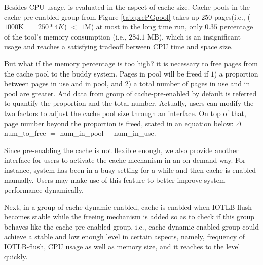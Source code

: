 Besides CPU usage, \name is evaluated in the aspect of cache size. Cache pools in the cache-pre-enabled group from Figure \ref{tab:prePGpool} takes up $250$ pages(i.e., ($1000$K $=$ $250 * 4K$) $<$ $1$M) at most in the long time run, only $0.35$ percentage of the tool's memory consumption (i.e., $284.1$ MB), which is an insignificant usage and reaches a satisfying tradeoff between CPU time and space size.

But what if the memory percentage is too high? it is necessary to free pages from the cache pool to the buddy system. Pages in pool will be freed if $1$) a proportion between pages in use and in pool, and $2$) a total number of pages in use and in pool are greater. And data from group of cache-pre-enabled by default is referred to quantify the proportion and the total number. Actually, users can modify the two factors to adjust the cache pool size through an interface. On top of that, page number beyond the proportion is freed, stated in an equation below: $\Delta$num\_to\_free $=$ num\_in\_pool $-$ num\_in\_use.

Since pre-enabling the cache is not flexible enough, we also provide another interface for users to activate the cache mechanism in an on-demand way. For instance, system has been in a busy setting for a while and then cache is enabled manually. Users may make use of this feature to better improve system performance dynamically.

Next, in a group of cache-dynamic-enabled, cache is enabled when IOTLB-flush becomes stable while the freeing mechanism is added so as to check if this group behaves like the cache-pre-enabled group, i.e., cache-dynamic-enabled group could achieve a stable and low enough level in certain aspects, namely, frequency of IOTLB-flush, CPU usage as well as memory size, and it reaches to the level quickly.


